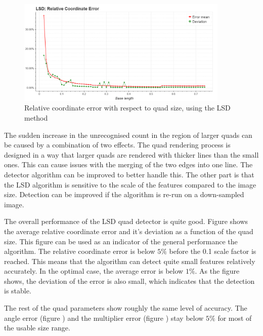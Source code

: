 \begin{figure}[ht]
	\centering
	\includegraphics[width=0.9\textwidth]{figures/plots/lsd_relative_coordinate_error.png}
	\caption{Relative coordinate error with respect to quad size, using the LSD method}
	\label{fig:lsdRelCoordErr}
\end{figure}
The sudden increase in the unrecognised count in the region of larger quads can be caused by a combination of two effects.
The quad rendering process is designed in a way that larger quads are rendered with thicker lines than the small ones.
This can cause issues with the merging of the two edges into one line.
The detector algorithm can be improved to better handle this.
The other part is that the LSD algorithm is sensitive to the scale of the features compared to the image size.
Detection can be improved if the algorithm is re-run on a down-sampled image.

The overall performance of the LSD quad detector is quite good.
Figure  shows the average relative coordinate error and it's deviation as a function of the quad size.
This figure can be used as an indicator of the general performance the algorithm.
The relative coordinate error is below $5\%$ before the 0.1 scale factor is reached.
This means that the algorithm can detect quite small features relatively accurately.
In the optimal case, the average error is below $1\%$.
As the figure shows, the deviation of the error is also small, which indicates that the detection is stable.

The rest of the quad parameters show roughly the same level of accuracy.
The angle error (figure ) and the multiplier error (figure ) stay below $5\%$ for most of the usable size range.

